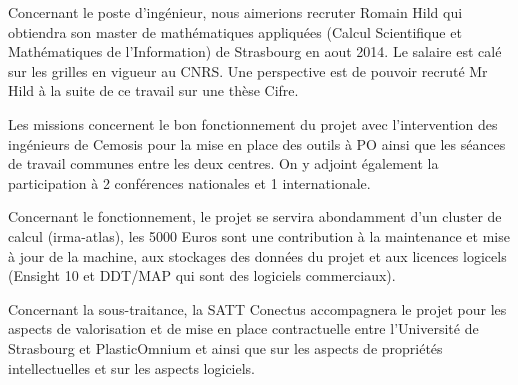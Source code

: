 \documentclass[12pt]{article}
\begin{document}
Concernant le poste d'ingénieur, nous aimerions recruter Romain Hild qui
obtiendra son master de mathématiques appliquées (Calcul Scientifique et
Mathématiques de l'Information) de Strasbourg en aout 2014. Le salaire est calé
sur les grilles en vigueur au CNRS. Une perspective est de pouvoir recruté Mr
Hild à la suite de ce travail sur une thèse Cifre.

Les missions concernent le bon fonctionnement du projet avec l'intervention des
ingénieurs de Cemosis pour la mise en place des outils à PO ainsi que les
séances de travail communes entre les deux centres. On y adjoint également la
participation à 2 conférences nationales et 1 internationale.

Concernant le fonctionnement, le projet se servira abondamment d'un cluster de
calcul (irma-atlas), les 5000 Euros sont une contribution à la maintenance et
mise à jour de la machine, aux stockages des données du projet et aux licences
logicels (Ensight 10 et DDT/MAP qui sont des logiciels commerciaux).

Concernant la sous-traitance, la SATT Conectus accompagnera le projet pour les
aspects de valorisation et de mise en place contractuelle entre l'Université de
Strasbourg et PlasticOmnium et ainsi que sur les aspects de propriétés
intellectuelles et sur les aspects logiciels.



\end{document}
